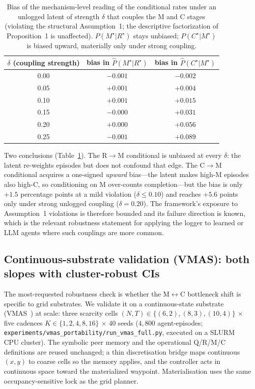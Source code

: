 \documentclass{article}
\newcommand{\method}[1]{\texttt{#1}}
\begin{document}
\begin{table}[h]
\caption{Bias of the mechanism-level reading of the conditional rates under an unlogged latent of strength $\delta$ that couples the M and C stages (violating the structural Assumption~1; the descriptive factorization of Proposition~1 is unaffected). $P(M^\star|R^\star)$ stays unbiased; $P(C^\star|M^\star)$ is biased upward, materially only under strong coupling.}
\label{p1:tab:assumption1-stress}
\centering
\small
\begin{tabular}{c c c}
\toprule
$\delta$ (coupling strength) & bias in $\hat P(M^\star|R^\star)$ & bias in $\hat P(C^\star|M^\star)$ \\
\midrule
0.00 & $-0.001$ & $-0.002$ \\
0.05 & $+0.001$ & $+0.004$ \\
0.10 & $+0.001$ & $+0.015$ \\
0.15 & $-0.000$ & $+0.031$ \\
0.20 & $+0.000$ & $+0.056$ \\
0.25 & $-0.001$ & $+0.089$ \\
\bottomrule
\end{tabular}
\end{table}

Two conclusions (Table~\ref{p1:tab:assumption1-stress}). The R$\to$M conditional is unbiased at every $\delta$: the latent re-weights episodes but does not confound that edge. The C$\to$M conditional acquires a one-signed \emph{upward} bias---the latent makes high-M episodes also high-C, so conditioning on M over-counts completion---but the bias is only $+1.5$ percentage points at a mild violation ($\delta\!\le\!0.10$) and reaches $+5.6$ points only under strong unlogged coupling ($\delta{=}0.20$). The framework's exposure to Assumption~1 violations is therefore bounded and its failure direction is known, which is the relevant robustness statement for applying the logger to learned or LLM agents where such couplings are more common.

\subsection{Continuous-substrate validation (VMAS): both slopes with cluster-robust CIs}
\label{p1:app:vmas}

The most-requested robustness check is whether the M$\leftrightarrow$C
bottleneck shift is specific to grid substrates. We validate it on a
continuous-state substrate (VMAS~\citep{bettini2022vmas}) at scale: three
scarcity cells $(N,T)\in\{(6,2),(8,3),(10,4)\}$ $\times$ five cadences
$K\in\{1,2,4,8,16\}$ $\times$ $40$ seeds ($4{,}800$ agent-episodes;
\method{experiments/vmas\_portability/run\_vmas\_full.py}, executed on a SLURM
CPU cluster). The symbolic peer memory and the operational Q/R/M/C definitions
are reused unchanged; a thin discretisation bridge maps continuous $(x,y)$ to
coarse cells so the memory applies, and the controller acts in continuous space
toward the materialized waypoint. Materialisation uses the same
occupancy-sensitive lock as the grid planner.
\end{document}
